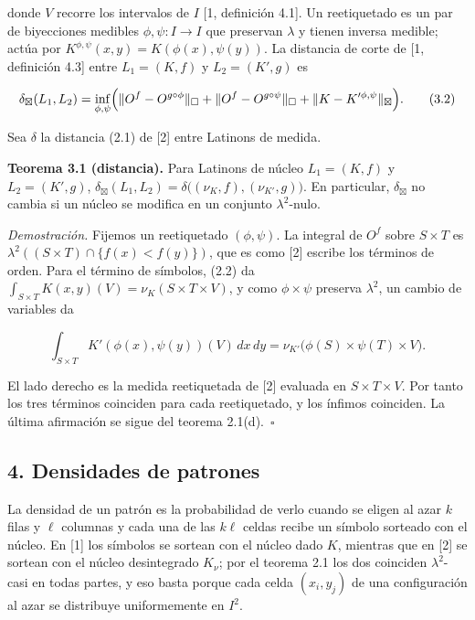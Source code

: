 \documentclass[spanish,11pt,a4paper]{article}
\begin{document}
donde \(V\) recorre los intervalos de \(I\) {[}1, definición 4.1{]}. Un reetiquetado es un par de biyecciones medibles \(\phi,\psi:I\to I\) que preservan \(\lambda\) y tienen inversa medible; actúa por \(K^{\phi,\psi}(x,y)=K(\phi(x),\psi(y))\). La distancia de corte de {[}1, definición 4.3{]} entre \(L_1=(K,f)\) y \(L_2=(K',g)\) es

\nopagebreak[4]
\[\delta_{\boxtimes}(L_1,L_2)=\inf_{\phi,\psi}\Bigl(\|O^f-O^{g\circ\phi}\|_\square+\|O^f-O^{g\circ\psi}\|_\square+\|K-K'^{\phi,\psi}\|_{\boxtimes}\Bigr).\tag{3.2}\]

Sea \(\delta\) la distancia (2.1) de {[}2{]} entre Latinons de medida.

\textbf{Teorema 3.1 (distancia).} Para Latinons de núcleo \(L_1=(K,f)\) y \(L_2=(K',g)\), \(\delta_{\boxtimes}(L_1,L_2)=\delta\bigl((\nu_K,f),(\nu_{K'},g)\bigr)\). En particular, \(\delta_{\boxtimes}\) no cambia si un núcleo se modifica en un conjunto \(\lambda^2\)-nulo.

\emph{Demostración.} Fijemos un reetiquetado \((\phi,\psi)\). La integral de \(O^f\) sobre \(S\times T\) es \(\lambda^2((S\times T)\cap\{f(x)<f(y)\})\), que es como {[}2{]} escribe los términos de orden. Para el término de símbolos, (2.2) da \(\int_{S\times T}K(x,y)(V)=\nu_K(S\times T\times V)\), y como \(\phi\times\psi\) preserva \(\lambda^2\), un cambio de variables da

\nopagebreak[4]
\[\int_{S\times T}K'(\phi(x),\psi(y))(V)\,dx\,dy=\nu_{K'}\bigl(\phi(S)\times\psi(T)\times V\bigr).\tag{3.3}\]

El lado derecho es la medida reetiquetada de {[}2{]} evaluada en \(S\times T\times V\). Por tanto los tres términos coinciden para cada reetiquetado, y los ínfimos coinciden. La última afirmación se sigue del teorema 2.1(d).~\(\square\)

\subsection{4. Densidades de patrones}\label{densidades-de-patrones}

La densidad de un patrón es la probabilidad de verlo cuando se eligen al azar \(k\) filas y \(\ell\) columnas y cada una de las \(k\ell\) celdas recibe un símbolo sorteado con el núcleo. En {[}1{]} los símbolos se sortean con el núcleo dado \(K\), mientras que en {[}2{]} se sortean con el núcleo desintegrado \(K_\nu\); por el teorema 2.1 los dos coinciden \(\lambda^2\)-casi en todas partes, y eso basta porque cada celda \((x_i,y_j)\) de una configuración al azar se distribuye uniformemente en \(I^2\).
\end{document}

